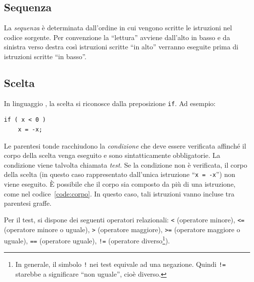 		\subsection{Sequenza}

La \emph{sequenza} è determinata dall'ordine in cui vengono scritte le istruzioni nel codice sorgente.
Per convenzione la ``lettura'' avviene dall'alto in basso e da sinistra verso destra così istruzioni scritte ``in alto'' verranno eseguite prima di istruzioni scritte ``in basso''.

		\subsection{Scelta}
In linguaggio , la scelta si riconosce dalla preposizione \lstinline!if!. Ad esempio:

\begin{lstlisting}
if ( x < 0 )
	x = -x;
\end{lstlisting}
Le parentesi tonde racchiudono la \emph{condizione} che deve essere verificata affinché il corpo della scelta venga eseguito e sono sintatticamente obbligatorie.
La condizione viene talvolta chiamata \emph{test}.
Se la condizione non è verificata, il corpo della scelta (in questo caso rappresentato dall'unica istruzione ``\lstinline!x = -x!'') non viene eseguito.
\`E possibile che il corpo sia composto da più di una istruzione, come nel codice~\ref{code:corpo}.
In questo caso, tali istruzioni vanno incluse tra parentesi graffe.

Per  il test, si dispone dei seguenti operatori relazionali: \lstinline!<! (operatore minore), \lstinline!<=! (operatore minore o uguale), \lstinline!>! (operatore maggiore), \lstinline!>=! (operatore maggiore o uguale), \lstinline!==! (operatore uguale), \lstinline?!=? (operatore diverso\footnote{In generale, il simbolo \lstinline?!? nei test equivale ad una negazione. Quindi \lstinline?!=? starebbe a significare ``non uguale'', cioè diverso.}).


